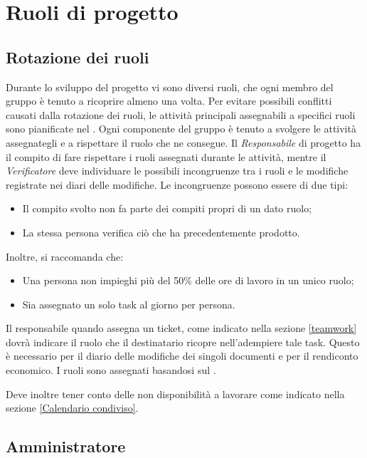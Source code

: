 \section{Ruoli di progetto}
\subsection{Rotazione dei ruoli}
\label{rotazioneruoli}
Durante lo sviluppo del progetto vi sono diversi ruoli, che ogni membro del gruppo \GroupName{} è tenuto a ricoprire almeno una volta. Per evitare possibili conflitti causati dalla rotazione dei ruoli, le attività principali assegnabili a specifici ruoli sono pianificate nel \PianoDiProgetto. Ogni componente del gruppo è tenuto a svolgere le attività assegnategli e a rispettare il ruolo che ne consegue. Il \textit{Responsabile} di progetto ha il compito di fare rispettare i ruoli assegnati durante le attività, mentre il \textit{Verificatore} deve individuare le possibili incongruenze tra i ruoli e le modifiche registrate nei diari delle modifiche.
Le incongruenze possono essere di due tipi:
\begin{itemize}
\item Il compito svolto non fa parte dei compiti propri di un dato ruolo;
\item La stessa persona verifica ciò che ha precedentemente prodotto.
\end{itemize}

Inoltre, si raccomanda che:
\begin{itemize}
\item Una persona non impieghi più del 50\% delle ore di lavoro in un unico ruolo;
\item Sia assegnato un solo task al giorno per persona.
\end{itemize}

Il responsabile quando assegna un ticket, come indicato nella sezione \ref{teamwork} dovrà indicare il ruolo che il destinatario ricopre nell'adempiere tale task. Questo è necessario per il diario delle modifiche dei singoli documenti e per il rendiconto economico. I ruoli sono assegnati basandosi sul \PianoDiProgetto. 

Deve inoltre tener conto delle non disponibilità a lavorare come indicato nella sezione \ref{Calendario condiviso}.

	\subsection{Amministratore}
	
